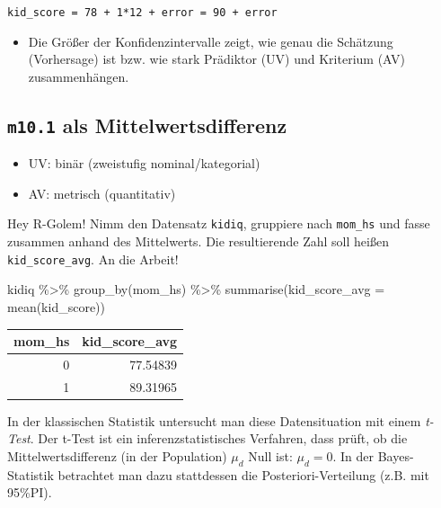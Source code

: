 \documentclass[
  a4paper,
  DIV=11]{scrreprt}
\newenvironment{Shaded}{\begin{snugshade}}{\end{snugshade}}
\newcommand{\AttributeTok}[1]{\textcolor[rgb]{0.40,0.45,0.13}{#1}}
\newcommand{\FunctionTok}[1]{\textcolor[rgb]{0.28,0.35,0.67}{#1}}
\newcommand{\NormalTok}[1]{\textcolor[rgb]{0.00,0.23,0.31}{#1}}
\newcommand{\SpecialCharTok}[1]{\textcolor[rgb]{0.37,0.37,0.37}{#1}}
\providecommand{\tightlist}{%
  \setlength{\itemsep}{0pt}\setlength{\parskip}{0pt}}\usepackage{longtable,booktabs,array}
\theoremstyle{definition}
\theoremstyle{remark}
\begin{document}
\texttt{kid\_score\ =\ 78\ +\ 1*12\ +\ error\ =\ 90\ +\ error}

\begin{itemize}
\tightlist
\item
  Die Größer der Konfidenzintervalle zeigt, wie genau die Schätzung
  (Vorhersage) ist bzw. wie stark Prädiktor (UV) und Kriterium (AV)
  zusammenhängen.
\end{itemize}

\hypertarget{m10.1-als-mittelwertsdifferenz}{%
\subsection{\texorpdfstring{\texttt{m10.1} als
Mittelwertsdifferenz}{m10.1 als Mittelwertsdifferenz}}\label{m10.1-als-mittelwertsdifferenz}}

\begin{itemize}
\tightlist
\item
  UV: binär (zweistufig nominal/kategorial)
\item
  AV: metrisch (quantitativ)
\end{itemize}

Hey R-Golem! Nimm den Datensatz \texttt{kidiq}, gruppiere nach
\texttt{mom\_hs} und fasse zusammen anhand des Mittelwerts. Die
resultierende Zahl soll heißen \texttt{kid\_score\_avg}. An die Arbeit!

\begin{Shaded}
\begin{Highlighting}[]
\NormalTok{kidiq }\SpecialCharTok{\%\textgreater{}\%} 
  \FunctionTok{group\_by}\NormalTok{(mom\_hs) }\SpecialCharTok{\%\textgreater{}\%} 
  \FunctionTok{summarise}\NormalTok{(}\AttributeTok{kid\_score\_avg =} 
              \FunctionTok{mean}\NormalTok{(kid\_score))}
\end{Highlighting}
\end{Shaded}

\begin{longtable}[]{@{}rr@{}}
\toprule()
mom\_hs & kid\_score\_avg \\
\midrule()
\endhead
0 & 77.54839 \\
1 & 89.31965 \\
\bottomrule()
\end{longtable}

In der klassischen Statistik untersucht man diese Datensituation mit
einem \emph{t-Test}. Der t-Test ist ein inferenzstatistisches Verfahren,
dass prüft, ob die Mittelwertsdifferenz (in der Population) \(\mu_d\)
Null ist: \(\mu_d = 0\). In der Bayes-Statistik betrachtet man dazu
stattdessen die Posteriori-Verteilung (z.B. mit 95\%PI).
\end{document}
